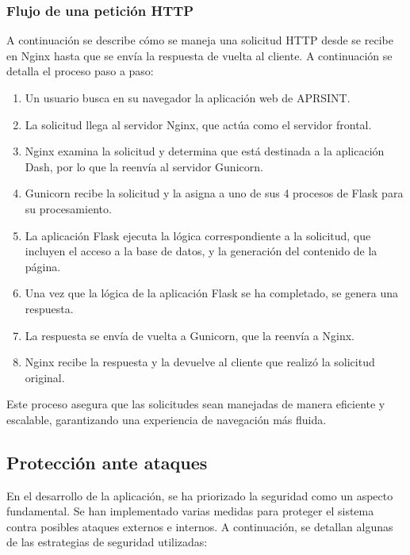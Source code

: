 \subsubsection*{Flujo de una petición HTTP}

A continuación se describe cómo se maneja una solicitud HTTP desde se recibe en Nginx hasta que se envía la respuesta de vuelta al cliente. A continuación se detalla el proceso paso a paso:

\begin{enumerate}
	\item Un usuario busca en su navegador la aplicación web de APRSINT.
	\item La solicitud llega al servidor Nginx, que actúa como el servidor frontal.
	\item Nginx examina la solicitud y determina que está destinada a la aplicación Dash, por lo que la reenvía al servidor Gunicorn.
	\item Gunicorn recibe la solicitud y la asigna a uno de sus 4 procesos de Flask para su procesamiento.
	\item La aplicación Flask ejecuta la lógica correspondiente a la solicitud, que incluyen el acceso a la base de datos, y la generación del contenido de la página.
	\item Una vez que la lógica de la aplicación Flask se ha completado, se genera una respuesta.
	\item La respuesta se envía de vuelta a Gunicorn, que la reenvía a Nginx.
	\item Nginx recibe la respuesta y la devuelve al cliente que realizó la solicitud original.
\end{enumerate}

Este proceso asegura que las solicitudes sean manejadas de manera eficiente y escalable, garantizando una experiencia de navegación más fluida.

\subsection{Protección ante ataques}

En el desarrollo de la aplicación, se ha priorizado la seguridad como un aspecto fundamental. Se han implementado varias medidas para proteger el sistema contra posibles ataques externos e internos. A continuación, se detallan algunas de las estrategias de seguridad utilizadas:

